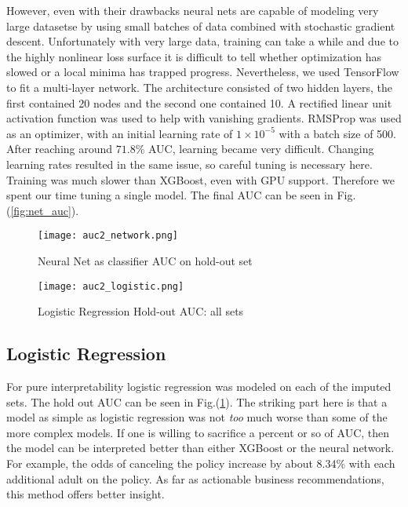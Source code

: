 \documentclass[11pt]{article}
\theoremstyle{remark}
\theoremstyle{definition}
\begin{document}
However, even with their drawbacks neural nets are capable of modeling very large datasetse by using small batches of data combined with stochastic gradient descent. Unfortunately with very large data, training can take a while and due to the highly nonlinear loss surface it is difficult to tell whether optimization has slowed or a local minima has trapped progress. Nevertheless, we used TensorFlow \citep{abadi2016} to fit a multi-layer network. The architecture consisted of two hidden layers, the first contained 20 nodes and the second one contained 10. A rectified linear unit activation function was used to help with vanishing gradients. RMSProp was used as an optimizer, with an initial learning rate of $1\times 10^{-5}$ with a batch size of 500. After reaching around $71.8\%$ AUC, learning became very difficult. Changing learning rates resulted in the same issue, so careful tuning is necessary here. Training was much slower than XGBoost, even with GPU support. Therefore we spent our time tuning a single model. The final AUC can be seen in Fig.(\ref{fig:net_auc}).
\begin{figure}[]
    \centering
    \begin{minipage}{.5\linewidth}
        \centering
        \texttt{[image: auc2\_network.png]}
        \caption{Neural Net as classifier AUC on hold-out set}
        \label{fig:net_auc}
    \end{minipage}%
    \begin{minipage}{0.5\linewidth}
        \centering
        \texttt{[image: auc2\_logistic.png]}
        \caption{Logistic Regression Hold-out AUC: all sets}
        \label{fig:auc_logit}
    \end{minipage}
\end{figure}
\subsection{Logistic Regression}
For pure interpretability logistic regression was modeled on each of the imputed sets. The hold out AUC can be seen in Fig.(\ref{fig:auc_logit}). The striking part here is that a model as simple as logistic regression was not \textit{too} much worse than some of the more complex models. If one is willing to sacrifice a percent or so of AUC, then the model can be interpreted better than either XGBoost or the neural network. For example, the odds of canceling the policy increase by about 8.34\% with each additional adult on the policy. As far as actionable business recommendations, this method offers better insight.
\end{document}
